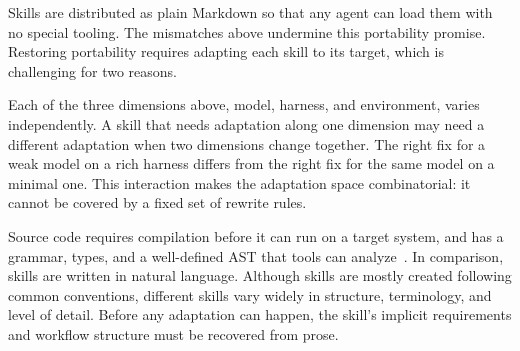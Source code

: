 Skills are distributed as plain Markdown so that any agent can load them with no special tooling.
The mismatches above undermine this portability promise.
Restoring portability requires adapting each skill to its
target, which is challenging for two reasons.

Each of the three dimensions above, model, harness, and
environment, varies independently. A skill that needs
adaptation along one dimension may need a different adaptation
when two dimensions change together. The right fix for a weak
model on a rich harness differs from the right fix for the
same model on a minimal one. This interaction makes the
adaptation space combinatorial: it cannot be covered by a
fixed set of rewrite rules.

Source code requires compilation before it can run on a target system,
and has a grammar, types, and a well-defined AST that tools can analyze~\cite{aho2006compilers}.
In comparison, skills are written in natural language.
Although skills are mostly created following common conventions,
different skills vary widely in structure, terminology, and level of detail.
Before any adaptation can happen, the skill's implicit requirements and workflow structure
must be recovered from prose.